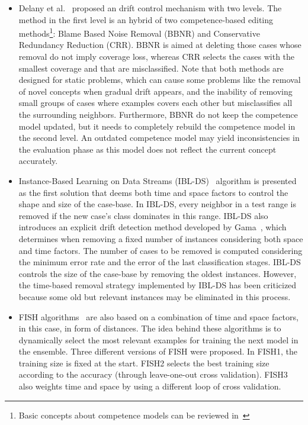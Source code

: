 \documentclass[preprint,12pt]{elsarticle}
\begin{document}
\begin{itemize}
	\item Delany et al.~\cite{delany05} proposed an drift control mechanism with two levels. The method in the first level is an hybrid of two competence-based editing methods\footnote{Basic concepts about competence models can be reviewed in~\cite{smyth95}}: Blame Based Noise Removal (BBNR) and Conservative Redundancy Reduction (CRR). BBNR is aimed at deleting those cases whose removal do not imply coverage loss, whereas CRR selects the cases with the smallest coverage and that are misclassified. Note that both methods are designed for static problems, which can cause some problems like the removal of novel concepts when gradual drift appears, and the inability of removing small groups of cases where examples covers each other but misclassifies all the surrounding neighbors. Furthermore, BBNR do not keep the competence model updated, but it needs to completely rebuild the competence model in the second level. An outdated competence model may yield inconsistencies in the evaluation phase as this model does not reflect the current concept accurately.
	\item Instance-Based Learning on Data Streams (IBL-DS)~\cite{berin07} algorithm is presented as the first solution that deems both time and space factors to control the shape and size of the case-base. In IBL-DS, every neighbor in a test range is removed if the new case's class dominates in this range. IBL-DS also introduces an explicit drift detection method developed by Gama~\cite{gama04}, which determines when removing a fixed number of instances considering both space and time factors. The number of cases to be removed is computed considering the minimum error rate and the error of the last classification stages. IBL-DS controls the size of the case-base by removing the oldest instances. However, the time-based removal strategy implemented by IBL-DS has been criticized because some old but relevant instances may be eliminated in this process.
	\item FISH algorithms~\cite{zlio11} are also based on a combination of time and space factors, in this case, in form of distances. The idea behind these algorithms is to dynamically select the most relevant examples for training the next model in the ensemble. Three different versions of FISH were proposed. In FISH1, the training size is fixed at the start. FISH2 selects the best training size according to the accuracy (through leave-one-out cross validation). FISH3 also weights time and space by using a different loop of cross validation.	

\end{itemize}
\end{document}
